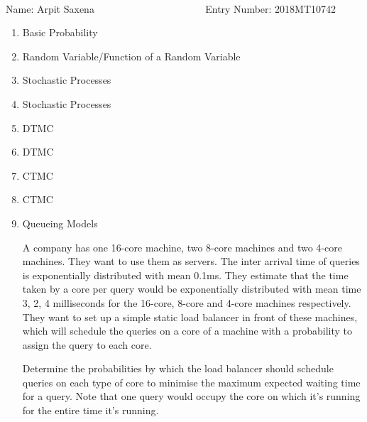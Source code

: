 \documentclass[12pt, oneside]{article}
\begin{document}
\setlength{\textheight}{8.5in}
\\





\vskip 0.5cm

\noindent Name: Arpit Saxena ~~~~~~~~~~~~~~~~~~~~~ Entry Number: 2018MT10742



\vskip 0.5cm



\begin{enumerate}
	




\item Basic Probability

\item Random Variable/Function of a Random Variable



\item Stochastic Processes

\item Stochastic Processes

\item DTMC


\item DTMC

\item CTMC


\item CTMC


\item {
    Queueing Models

    A company has one 16-core machine, two 8-core machines and two 4-core machines. They want
    to use them as servers. The inter arrival time of queries is exponentially distributed
    with mean 0.1ms. They estimate that the time taken by a core per query
    would be exponentially distributed with mean time 3, 2, 4 milliseconds for the 16-core,
    8-core and 4-core machines respectively. They want to set up a simple static load 
    balancer in front of these machines, which will schedule the queries on a core of a 
    machine with a probability to assign the query to each core.

    Determine the probabilities by which the load balancer should schedule queries on each
    type of core to minimise the maximum expected waiting time for a query. Note that one 
    query would occupy the core on which it's running for the entire time it's running.

}
\end{enumerate}
\end{document}
